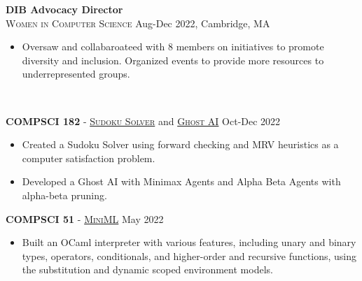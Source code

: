 \documentclass[11pt]{article}
\begin{document}
  \noindent\textbf{DIB Advocacy Director} \\
  \textsc{Women in Computer Science} \hfill Aug-Dec 2022, Cambridge, MA
  \begin{itemize}[itemsep=-.4em, leftmargin=1em]\vspace{-2mm}
    \item Oversaw and collabaroateed with 8 members on initiatives to promote diversity and inclusion. Organized events to provide more resources to underrepresented groups.
  \end{itemize}

  \vspace{-7pt}\\
  \noindent\makebox[\linewidth]{\rule{7.5in}{0.3pt}}

    \noindent \textbf{COMPSCI 182} - \href{http://procaccia.info/courses/CS182-F22/pset2.pdf}{\textsc{Sudoku Solver}} and \href{http://procaccia.info/courses/CS182-F22/pset3.pdf}{\textsc{Ghost AI}} \hfill Oct-Dec 2022
    \begin{itemize}[itemsep=-.4em, leftmargin=1em]\vspace{-2mm}
      \item Created a Sudoku Solver using forward checking and MRV heuristics as a computer satisfaction problem.
      \item Developed a Ghost AI with Minimax Agents and Alpha Beta Agents with alpha-beta pruning. 
    \end{itemize}\vspace{-1mm}

    \noindent \textbf{COMPSCI 51} - \href{https://book.cs51.io/pdfs/abstraction-21-project.pdf}{\textsc{MiniML}} \hfill May 2022
    \begin{itemize}[itemsep=-.4em, leftmargin=1em]\vspace{-2mm}
      \item Built an OCaml interpreter with various features, including unary and binary types, operators, conditionals, and higher-order and recursive functions, using the substitution and dynamic scoped environment models. 
    \end{itemize}\vspace{-1mm}
\end{document}
